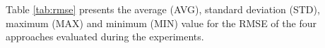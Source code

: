\documentclass[conference]{IEEEtran}
\begin{document}
% 

% 


Table \ref{tab:rmse} presents the average (AVG), standard deviation (STD),
maximum (MAX) and minimum (MIN) value for the RMSE of the four approaches
evaluated during the experiments.
\end{document}
